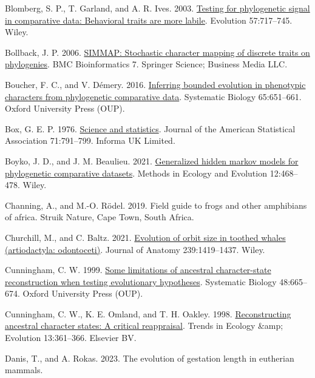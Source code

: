 \documentclass{article}
\newlength{\cslhangindent}
\newenvironment{CSLReferences}[2] %
 {\begin{list}{}{%
  \setlength{\itemindent}{0pt}
  \setlength{\leftmargin}{0pt}
  \setlength{\parsep}{0pt}
  \ifodd #1
   \setlength{\leftmargin}{\cslhangindent}
   \setlength{\itemindent}{-1\cslhangindent}
  \fi
  \setlength{\itemsep}{#2\baselineskip}}}
 {\end{list}}
\begin{document}
\begin{CSLReferences}{1}{0}
Blomberg, S. P., T. Garland, and A. R. Ives. 2003. \href{https://doi.org/10.1111/j.0014-3820.2003.tb00285.x}{Testing for phylogenetic signal in comparative data: Behavioral traits are more labile}. Evolution 57:717--745. Wiley.

Bollback, J. P. 2006. \href{https://doi.org/10.1186/1471-2105-7-88}{{SIMMAP}: Stochastic character mapping of discrete traits on phylogenies}. BMC Bioinformatics 7. Springer Science; Business Media LLC.

Boucher, F. C., and V. Démery. 2016. \href{https://doi.org/10.1093/sysbio/syw015}{Inferring bounded evolution in phenotypic characters from phylogenetic comparative data}. Systematic Biology 65:651--661. Oxford University Press (OUP).

Box, G. E. P. 1976. \href{https://doi.org/10.1080/01621459.1976.10480949}{Science and statistics}. Journal of the American Statistical Association 71:791--799. Informa UK Limited.

Boyko, J. D., and J. M. Beaulieu. 2021. \href{https://doi.org/10.1111/2041-210x.13534}{Generalized hidden markov models for phylogenetic comparative datasets}. Methods in Ecology and Evolution 12:468--478. Wiley.

Channing, A., and M.-O. Rödel. 2019. Field guide to frogs and other amphibians of africa. Struik Nature, Cape Town, South Africa.

Churchill, M., and C. Baltz. 2021. \href{https://doi.org/10.1111/joa.13522}{Evolution of orbit size in toothed whales (artiodactyla: odontoceti)}. Journal of Anatomy 239:1419--1437. Wiley.

Cunningham, C. W. 1999. \href{https://doi.org/10.1080/106351599260238}{Some limitations of ancestral character-state reconstruction when testing evolutionary hypotheses}. Systematic Biology 48:665--674. Oxford University Press (OUP).

Cunningham, C. W., K. E. Omland, and T. H. Oakley. 1998. \href{https://doi.org/10.1016/s0169-5347(98)01382-2}{Reconstructing ancestral character states: A critical reappraisal}. Trends in Ecology \&amp; Evolution 13:361--366. Elsevier BV.

Danis, T., and A. Rokas. 2023. The evolution of gestation length in eutherian mammals.


\end{CSLReferences}
\end{document}
